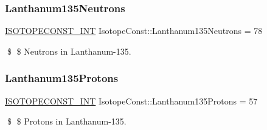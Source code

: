 \subsubsection{\texorpdfstring{Lanthanum135\+Neutrons}{Lanthanum135Neutrons}}
{\footnotesize\ttfamily \mbox{\hyperlink{group___isotope_const-_macros_ga5f18360b3e99483a35c32d789e62621c}{I\+S\+O\+T\+O\+P\+E\+C\+O\+N\+S\+T\+\_\+\+I\+NT}} Isotope\+Const\+::\+Lanthanum135\+Neutrons = 78}

\$ \$ Neutrons in Lanthanum-\/135. \mbox{\label{group___isotope_const-_lanthanum-_la135_ga1fb140e2a4a6e64140c1fca5edad4592}} 
\subsubsection{\texorpdfstring{Lanthanum135\+Protons}{Lanthanum135Protons}}
{\footnotesize\ttfamily \mbox{\hyperlink{group___isotope_const-_macros_ga5f18360b3e99483a35c32d789e62621c}{I\+S\+O\+T\+O\+P\+E\+C\+O\+N\+S\+T\+\_\+\+I\+NT}} Isotope\+Const\+::\+Lanthanum135\+Protons = 57}

\$ \$ Protons in Lanthanum-\/135. 